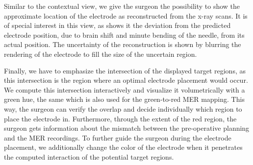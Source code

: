 \documentclass[review]{vgtc}                 %
\begin{document}
Similar to the contextual view, we give the surgeon the possibility to show the approximate location of the electrode as reconstructed from the x-ray scans. It is of special interest in this view, as shows it the deviation from the predicted electrode position, due to brain shift and minute bending of the needle, from its actual position. The uncertainty of the reconstruction is shown by blurring the rendering of the electrode to fill the size of the uncertain region.

Finally, we have to emphasize the intersection of the displayed target regions, as this intersection is the region where an optimal electrode placement would occur. We compute this intersection interactively and visualize it volumetrically with a green hue, the same which is also used for the green-to-red MER mapping. This way, the surgeon can verify the overlap and decide individually which region to place the electrode in. Furthermore, through the extent of the red region, the surgeon gets information about the mismatch between the pre-operative planning and the MER recordings. To further guide the surgeon during the electrode placement, we additionally change the color of the electrode when it penetrates the computed interaction of the potential target regions.
\end{document}
